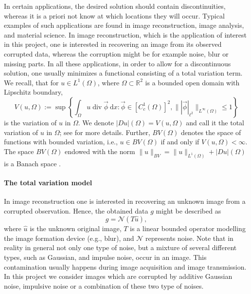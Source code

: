 \documentclass[enabledeprecatedfontcommands,cleardoublepage=empty,headsepline,twoside,11pt,DIV=15,BCOR=12mm,final]{scrartcl}
\newcommand{\N}{{\mathbb N}}
\newcommand{\R}{{\mathbb R}}
\begin{document}
In certain applications, the desired solution should contain discontinuities, whereas it is a priori not know at which locations they will occur. Typical examples of such applications are found in image reconstruction, image analysis, and material science. In image reconstruction, which is the application of interest in this project, one is interested in recovering an image from its observed corrupted data, whereas the corruption might be for example noise, blur or missing parts. %
 In all these applications, in order to allow for a discontinuous solution, one usually minimizes a functional consisting of a total variation term. We recall, that for $u\in L^1(\Omega)$, where $\Omega \subset \R^2$ is a bounded open domain with Lipschitz boundary,
$$
V(u,\Omega):=\sup\left\{\int_{\Omega} u \operatorname{div} \vec\phi \ \text{d}x : \vec\phi \in [C_c^1(\Omega)]^2, \|{|\vec\phi|_{\ell^2}}\|_{L^\infty(\Omega)} \leq 1\right\}
$$
is the variation of $u$ in $\Omega$. 
We denote $|Du|(\Omega)=V(u,\Omega)$ and call it the total variation of $u$ in $\Omega$; see \cite{AmbFusPal, Giu} for more details.
 Further, $BV(\Omega)$ denotes the space of functions with bounded variation, i.e., $u\in BV(\Omega)$ if and only if $V(u,\Omega)<\infty$. The space $BV(\Omega)$ endowed with the norm $\|u\|_{BV} = \|u\|_{L^1(\Omega)} + |Du|(\Omega)$ is a Banach space \cite{Giu}. 

\paragraph{The total variation model}

In image reconstruction one is interested in recovering an unknown image from a corrupted observation. Hence, the obtained data $g$ might be described as
\begin{equation}\label{eq:g}
g=\mathcal{N}(T\hat{u}),
\end{equation}
where $\hat{u}$ is the unknown original image, $T$ is a linear bounded operator modelling the image formation device (e.g., blur), and $\mathcal{N}$ represents noise. 
Note that in reality in general not only one type of noise, but a mixture of several different types, such as Gaussian, and impulse noise, occur in an image. This contamination usually happens during image acquisition and image transmission. In this project we consider images which are corrupted by additive Gaussian noise, impulsive noise or a combination of these two type of noises.
\end{document}
